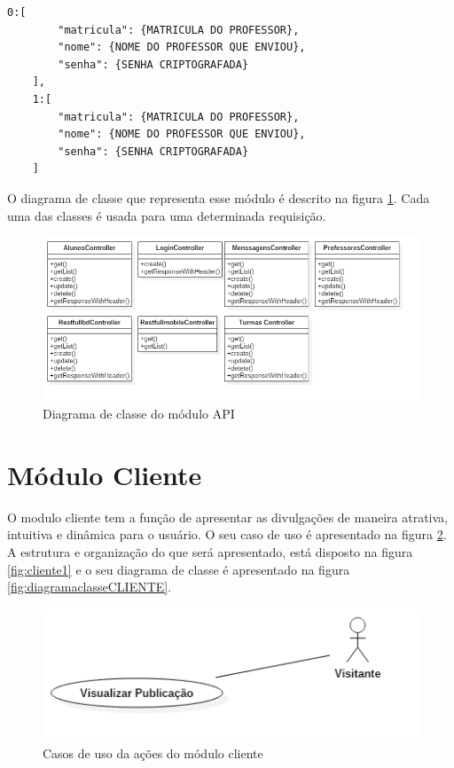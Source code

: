 \begin{lstlisting}[caption={Retorno da requisição \ref{lst:bd}},label={lst:retornoprofessores}]
	0:[
		"matricula": {MATRICULA DO PROFESSOR},
		"nome": {NOME DO PROFESSOR QUE ENVIOU},
		"senha": {SENHA CRIPTOGRAFADA}
	],
	1:[		
		"matricula": {MATRICULA DO PROFESSOR},
		"nome": {NOME DO PROFESSOR QUE ENVIOU},
		"senha": {SENHA CRIPTOGRAFADA}
	]
\end{lstlisting}

O diagrama de classe que representa esse módulo é descrito na figura \ref{fig:diagramaclasseAPI}. Cada uma das classes é usada para uma determinada requisição.
\begin{figure}[H]
\centering
\includegraphics[scale=0.5]{figuras/diagramaclasseAPI}
\caption{Diagrama de classe do módulo API}
\label{fig:diagramaclasseAPI}
\end{figure}

\section{Módulo Cliente}
\label{sec:cliente}
O modulo cliente tem a função de apresentar as divulgações de maneira atrativa, intuitiva e dinâmica para o usuário. O seu caso de uso é apresentado na figura \ref{fig:casosDeUsoCliente}. A estrutura e organização do que será apresentado, está disposto na figura \ref{fig:cliente1} e o seu diagrama de classe é apresentado na figura \ref{fig:diagramaclasseCLIENTE}.

\begin{figure}[H]
\centering
\includegraphics[scale=0.6]{figuras/casosDeUsoCliente}
\caption{Casos de uso da ações do módulo cliente}
\label{fig:casosDeUsoCliente}
\end{figure} 


